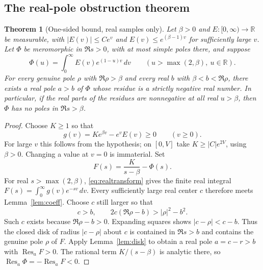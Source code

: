\documentclass[11pt,letterpaper]{article}
\newtheorem{theorem}{Theorem}[section]\newtheorem{lemma}[theorem]{Lemma}\newtheorem{corollary}[theorem]{Corollary}\newtheorem{proposition}[theorem]{Proposition}
\theoremstyle{remark}\newtheorem{remark}[theorem]{Remark}
\newcommand{\R}{\mathbb R}\newcommand{\C}{\mathbb C}\newcommand{\Res}{\operatorname{Res}}
\begin{document}
\subsection{The real-pole obstruction theorem}
\begin{theorem}[One-sided bound, real samples only]\label{thm:real}
Let $\beta>0$ and $E:[0,\infty)\to\R$ be measurable, with $|E(v)|\le C e^v$ and $E(v)\le e^{(\beta-1)v}$ for sufficiently large $v$. Let $\Phi$ be meromorphic in $\Re s>0$, with at most simple poles there, and suppose
\begin{equation}\label{eq:realtransform}
 \Phi(u)=\int_0^\infty E(v)e^{(1-u)v}\,dv\qquad(u>\max(2,\beta),\ u\in\R).
\end{equation}
For every genuine pole $\rho$ with $\Re\rho>\beta$ and every real $b$ with $\beta<b<\Re\rho$, there exists a real pole $a>b$ of $\Phi$ whose residue is a strictly negative real number. In particular, if the real parts of the residues are nonnegative at all real $u>\beta$, then $\Phi$ has no poles in $\Re s>\beta$.
\end{theorem}
\begin{proof}
Choose $K\ge1$ so that
\[
 g(v)=K e^{\beta v}-e^v E(v)\ge0\qquad(v\ge0).
\]
For large $v$ this follows from the hypothesis; on $[0,V]$ take $K\ge |C| e^{2V}$, using $\beta>0$. Changing a value at $v=0$ is immaterial. Set
\[
 F(s)=\frac{K}{s-\beta}-\Phi(s).
\]
For real $s>\max(2,\beta)$, \eqref{eq:realtransform} gives the finite real integral $F(s)=\int_0^\infty g(v)e^{-sv}\,dv$. Every sufficiently large real center $c$ therefore meets Lemma~\ref{lem:coeff}. Choose $c$ still larger so that
\begin{equation}\label{eq:center}
 c>b,\qquad 2c(\Re\rho-b)>|\rho|^2-b^2.
\end{equation}
Such $c$ exists because $\Re\rho-b>0$. Expanding squares shows $|c-\rho|<c-b$. Thus the closed disk of radius $|c-\rho|$ about $c$ is contained in $\Re s>b$ and contains the genuine pole $\rho$ of $F$. Apply Lemma~\ref{lem:disk} to obtain a real pole $a=c-r>b$ with $\Res_a F>0$. The rational term $K/(s-\beta)$ is analytic there, so $\Res_a\Phi=-\Res_a F<0$.
\end{proof}
\end{document}
